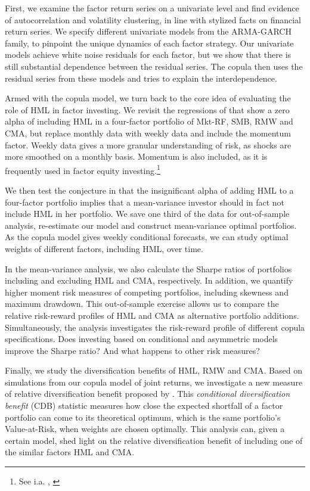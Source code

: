 First, we examine the factor return series on a univariate level and find evidence of autocorrelation and volatility clustering, in line with stylized facts on financial return series. We specify different univariate models from the ARMA-GARCH family, to pinpoint the unique dynamics of each factor strategy. Our univariate models achieve white noise residuals for each factor, but we show that there is still substantial dependence between the residual series. The copula then uses the residual series from these models and tries to explain the interdependence.

Armed with the copula model, we turn back to the core idea of evaluating the role of HML in factor investing. We revisit the regressions of \textcite{FF2015} that show a zero alpha of including HML in a four-factor portfolio of Mkt-RF, SMB, RMW and CMA, but replace monthly data with weekly data and include the momentum factor. Weekly data gives a more granular understanding of risk, as shocks are more smoothed on a monthly basis. Momentum is also included, as it is frequently used in factor equity investing.\footnote{See i.a. \textcite{Pedersen2015}, \textcite{Ilmanen2011}} 

We then test the conjecture in \textcite{FF2015} that the insignificant alpha of adding HML to a four-factor portfolio implies that a mean-variance investor should in fact not include HML in her portfolio. We save one third of the data for out-of-sample analysis, re-estimate our model and construct mean-variance optimal portfolios. As the copula model gives weekly conditional forecasts, we can study optimal weights of different factors, including HML, over time.

In the mean-variance analysis, we also calculate the Sharpe ratios of portfolios including and excluding HML and CMA, respectively. In addition, we quantify higher moment risk measures of competing portfolios, including skewness and maximum drawdown. This out-of-sample exercise allows us to compare the relative risk-reward profiles of HML and CMA as alternative portfolio additions. Simultaneously, the analysis investigates the risk-reward profile of different copula specifications. Does investing based on conditional and asymmetric models improve the Sharpe ratio? And what happens to other risk measures?

Finally, we study the diversification benefits of HML, RMW and CMA. Based on simulations from our copula model of joint returns, we investigate a new measure of relative diversification benefit proposed by \textcite{ChristoffersenErrunzaJacobLanglois2012}. This \emph{conditional diversification benefit} (CDB) statistic measures how close the expected shortfall of a factor portfolio can come to its theoretical optimum, which is the same portfolio's Value-at-Risk, when weights are chosen optimally. This analysis can, given a certain model, shed light on the relative diversification benefit of including one of the similar factors HML and CMA.

